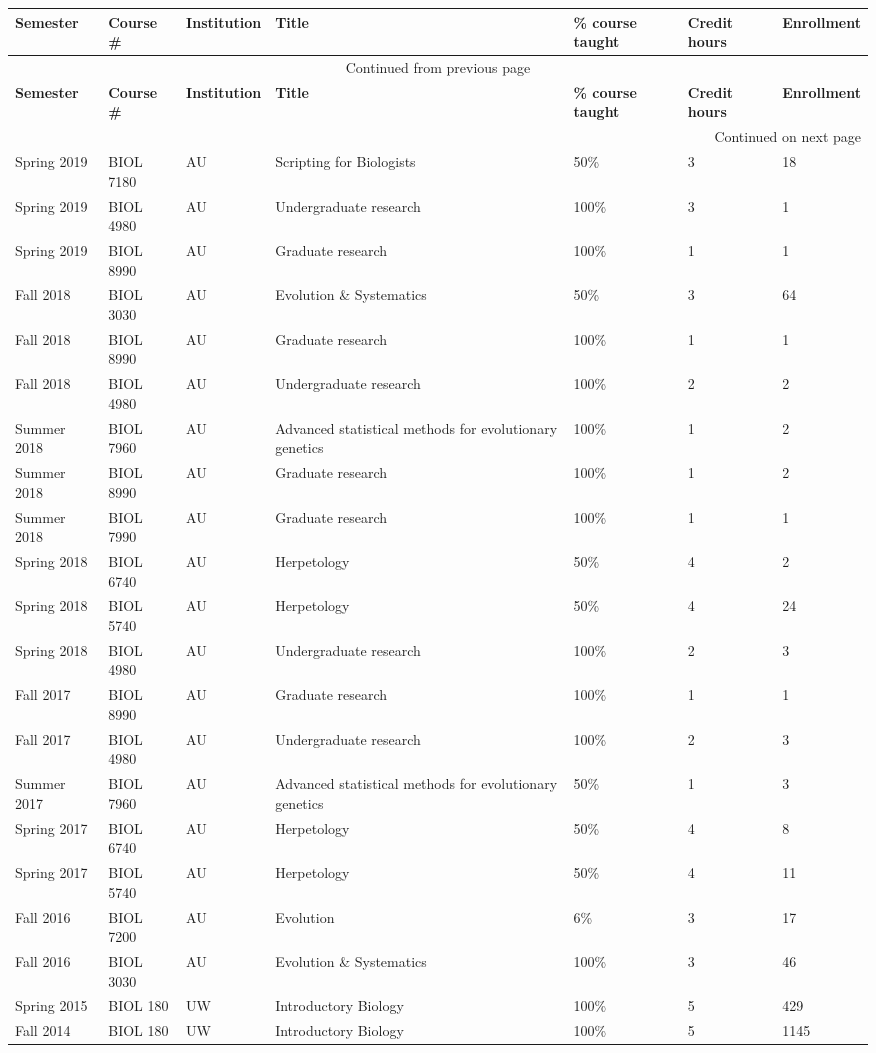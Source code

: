 {\sffamily\small
\begin{longtable}[l]{ @{} p{0.7in} p{0.7in} p{0.7in} p{1.5in} p{0.7in} p{0.4in} p{0.8in} @{} }
    \hline
    \textbf{Semester} & \textbf{Course \#} & \textbf{Institution} & \textbf{Title} & \textbf{\% course taught} & \textbf{Credit hours} & \textbf{Enrollment} \\
    \hline
    \endfirsthead
    \multicolumn{7}{c}{{Continued from previous page}} \\
    \hline
    \textbf{Semester} & \textbf{Course \#} & \textbf{Institution} & \textbf{Title} & \textbf{\% course taught} & \textbf{Credit hours} & \textbf{Enrollment} \\
    \hline
    \endhead
    \hline \multicolumn{7}{|r|}{{Continued on next page}} \\
    \endfoot
    \hline
    \endlastfoot
    Spring 2019 & BIOL 7180 & AU & Scripting for Biologists & 50\% & 3 & 18 \\
    Spring 2019 & BIOL 4980 & AU & Undergraduate research & 100\% & 3 & 1 \\ 
    Spring 2019 & BIOL 8990 & AU & Graduate research & 100\% & 1 & 1 \\ 
    Fall 2018 & BIOL 3030 & AU & Evolution \& Systematics & 50\% & 3 & 64 \\
    Fall 2018 & BIOL 8990 & AU & Graduate research & 100\% & 1 & 1 \\ 
    Fall 2018 & BIOL 4980 & AU & Undergraduate research & 100\% & 2 & 2 \\ 
    Summer 2018 & BIOL 7960 & AU & Advanced statistical methods for evolutionary genetics & 100\% & 1 & 2 \\
    Summer 2018 & BIOL 8990 & AU & Graduate research & 100\% & 1 & 2 \\ 
    Summer 2018 & BIOL 7990 & AU & Graduate research & 100\% & 1 & 1 \\ 
    Spring 2018 & BIOL 6740 & AU & Herpetology & 50\% & 4 & 2 \\
    Spring 2018 & BIOL 5740 & AU & Herpetology & 50\% & 4 & 24 \\
    Spring 2018 & BIOL 4980 & AU & Undergraduate research & 100\% & 2 & 3 \\ 
    Fall 2017 & BIOL 8990 & AU & Graduate research & 100\% & 1 & 1 \\ 
    Fall 2017 & BIOL 4980 & AU & Undergraduate research & 100\% & 2 & 3 \\ 
    Summer 2017 & BIOL 7960 & AU & Advanced statistical methods for evolutionary genetics & 50\% & 1 & 3 \\
    Spring 2017 & BIOL 6740 & AU & Herpetology & 50\% & 4 & 8 \\
    Spring 2017 & BIOL 5740 & AU & Herpetology & 50\% & 4 & 11 \\
    Fall 2016 & BIOL 7200 & AU & Evolution & 6\% & 3 & 17 \\
    Fall 2016 & BIOL 3030 & AU & Evolution \& Systematics & 100\% & 3 & 46 \\
    Spring 2015 & BIOL 180 & UW & Introductory Biology & 100\% & 5 & 429 \\
    Fall 2014 & BIOL 180 & UW & Introductory Biology & 100\% & 5 & 1145 \\
\end{longtable}
}
